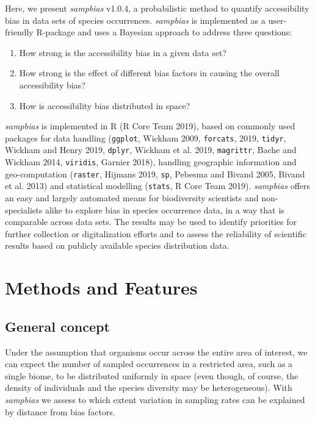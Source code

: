 \documentclass[
  12pt,
]{article}
\begin{document}
Here, we present \emph{sampbias} v1.0.4, a probabilistic method to quantify accessibility bias in data sets of species occurrences. \emph{sampbias} is implemented as a user-friendly R-package and uses a Bayesian approach to address three questions:

\begin{enumerate}
\def\labelenumi{\arabic{enumi})}
\item
  How strong is the accessibility bias in a given data set?
\item
  How strong is the effect of different bias factors in causing the overall accessibility bias?
\item
  How is accessibility bias distributed in space?
\end{enumerate}

\emph{sampbias} is implemented in R (R Core Team 2019), based on commonly used packages for data handling (\texttt{ggplot}, Wickham 2009, \texttt{forcats}, 2019, \texttt{tidyr}, Wickham and Henry 2019, \texttt{dplyr}, Wickham et al. 2019, \texttt{magrittr}, Bache and Wickham 2014, \texttt{viridis}, Garnier 2018), handling geographic information and geo-computation (\texttt{raster}, Hijmans 2019, \texttt{sp}, Pebesma and Bivand 2005, Bivand et al. 2013) and statistical modelling (\texttt{stats}, R Core Team 2019). \emph{sampbias} offers an easy and largely automated means for biodiversity scientists and non-specialists alike to explore bias in species occurrence data, in a way that is comparable across data sets. The results may be used to identify priorities for further collection or digitalization efforts and to assess the reliability of scientific results based on publicly available species distribution data.

\hypertarget{methods-and-features}{%
\section{Methods and Features}\label{methods-and-features}}

\hypertarget{general-concept}{%
\subsection{General concept}\label{general-concept}}

Under the assumption that organisms occur across the entire area of interest, we can expect the number of sampled occurrences in a restricted area, such as a single biome, to be distributed uniformly in space (even though, of course, the density of individuals and the species diversity may be heterogeneous). With \emph{sampbias} we assess to which extent variation in sampling rates can be explained by distance from bias factors.
\end{document}
